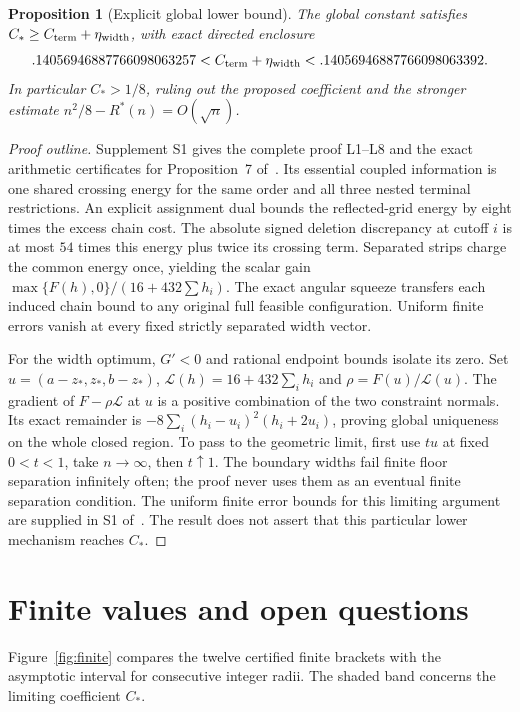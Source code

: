 \documentclass[11pt,letterpaper]{article}
\newtheorem{proposition}[theorem]{Proposition}
\theoremstyle{definition}\newtheorem{definition}[theorem]{Definition}
\theoremstyle{remark}\newtheorem{remark}[theorem]{Remark}
\newcommand{\Rstar}{R^\ast}
\newcommand{\CC}{C_\ast}
\begin{document}
\begin{proposition}[Explicit global lower bound]\label{prop:lower}
The global constant satisfies $\CC\ge C_{\rm term}+\eta_{\rm width}$,
with exact directed enclosure
\[
 .14056946887766098063257
 < C_{\rm term}+\eta_{\rm width}
 < .14056946887766098063392.
\]
In particular $\CC>1/8$, ruling out the proposed coefficient
and the stronger estimate $n^2/8-\Rstar(n)=O(\sqrt n)$.
\end{proposition}
\begin{proof}[Proof outline]
Supplement S1 gives the complete proof L1--L8 and the exact arithmetic
certificates for Proposition~7 of~\cite{supp}.
Its essential coupled information is one shared crossing energy for the
same order and all three nested terminal restrictions. An explicit assignment
dual bounds the reflected-grid energy by eight times the excess chain cost.
The absolute signed deletion discrepancy at cutoff $i$ is at most $54$
times this energy plus twice its crossing term. Separated strips charge
the common energy once, yielding
the scalar gain $\max\{F(h),0\}/(16+432\sum h_i)$.
The exact angular squeeze transfers each induced chain bound to any original
full feasible configuration. Uniform finite errors vanish at every fixed
strictly separated width vector.

For the width optimum, $G'<0$ and rational endpoint bounds isolate its zero.
Set $u=(a-z_*,z_*,b-z_*)$, $\mathcal L(h)=16+432\sum_i h_i$ and
$\rho=F(u)/\mathcal L(u)$. The gradient of $F-\rho\mathcal L$ at $u$ is a positive
combination of the two constraint normals. Its exact remainder is
$-8\sum_i(h_i-u_i)^2(h_i+2u_i)$, proving global uniqueness on the whole
closed region. To pass to the geometric limit, first use $tu$ at fixed
$0<t<1$, take $n\to\infty$, then $t\uparrow1$. The boundary
widths fail finite floor separation infinitely often; the proof never uses
them as an eventual finite separation condition. The uniform finite error bounds for this
limiting argument are supplied in S1 of~\cite{supp}. The result does not assert
that this particular lower mechanism reaches $\CC$.
\end{proof}

\section{Finite values and open questions}

Figure~\ref{fig:finite} compares the twelve certified finite brackets
with the asymptotic interval for consecutive integer radii. The shaded
band concerns the limiting coefficient $\CC$.
\end{document}
